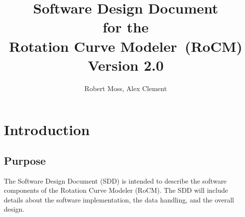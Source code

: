 \documentclass[titlepage]{article}
\def \RoCM {Rotation Curve Modeler}
\begin{document}
\title{
\textbf{
Software Design Document}
\protect\\
for the
\protect\\
\textbf{
\RoCM\ (RoCM)}
\protect\\
{\small Version 2.0}}

\author{Robert Moss, Alex Clement}
\maketitle

\newpage
\tableofcontents{} 
\newpage

\section{Introduction}

\subsection{Purpose}
The Software Design Document (SDD) is intended to describe the software components of the Rotation Curve Modeler (RoCM). The SDD will include details about the software implementation, the data handling, and the overall design. 
\end{document}
